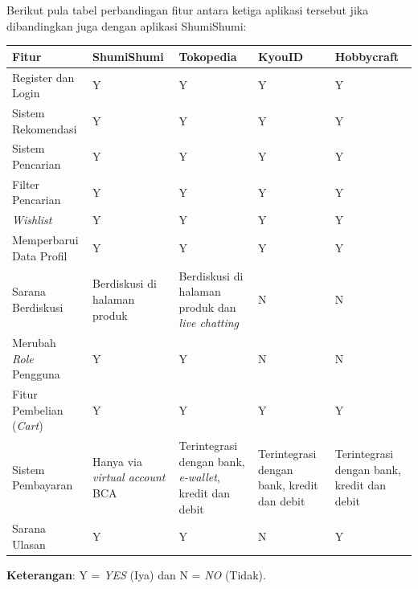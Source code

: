 \documentclass[a4paper]{article}
\begin{document}
\begin{itemize}
        \newpage
        Berikut pula tabel perbandingan fitur antara ketiga aplikasi tersebut jika dibandingkan juga dengan aplikasi ShumiShumi:

        \begin{centering}
            \begin{longtable}{|p{3cm}|p{2cm}|p{2cm}|p{3cm}|p{2cm}|}
                \hline
                Fitur & ShumiShumi & Tokopedia & KyouID & Hobbycraft\\
                \hline
                Register dan Login & Y & Y & Y & Y\\
                \hline
                Sistem Rekomendasi & Y & Y & Y & Y\\
                \hline
                Sistem Pencarian & Y & Y & Y & Y\\
                \hline
                Filter Pencarian & Y & Y & Y & Y\\
                \hline
                \textit{Wishlist} & Y & Y & Y & Y\\
                \hline
                Memperbarui Data Profil & Y & Y & Y & Y\\
                \hline
                Sarana Berdiskusi & Berdiskusi di halaman produk & Berdiskusi di halaman produk dan \textit{live chatting} & N & N\\
                \hline
                Merubah \textit{Role} Pengguna & Y & Y & N & N\\
                \hline
                Fitur Pembelian (\textit{Cart}) & Y & Y & Y & Y\\
                \hline
                Sistem Pembayaran & Hanya via \textit{virtual account} BCA & Terintegrasi dengan bank, \textit{e-wallet}, kredit dan debit & Terintegrasi dengan bank, kredit dan debit & Terintegrasi dengan bank, kredit dan debit\\
                \hline
                Sarana Ulasan & Y & Y & N & Y\\
                \hline
            \end{longtable}
        \end{centering}

        \textbf{Keterangan}: Y = \textit{YES} (Iya) dan N = \textit{NO} (Tidak).

\end{itemize}


\end{document}
